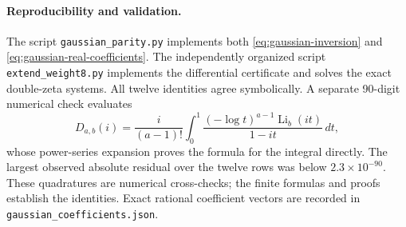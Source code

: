 \paragraph{Reproducibility and validation.}
The script \texttt{gaussian\_parity.py} implements both
\eqref{eq:gaussian-inversion} and \eqref{eq:gaussian-real-coefficients}.
The independently organized script \texttt{extend\_weight8.py} implements
the differential certificate and solves the exact double-zeta systems.
All twelve identities agree symbolically. A separate 90-digit numerical
check evaluates
\[
 D_{a,b}(i)=\frac{i}{(a-1)!}\int_0^1
       \frac{(-\log t)^{a-1}\operatorname{Li}_b(it)}{1-it}\,dt,
\]
whose power-series expansion proves the formula for the integral directly.
The largest observed absolute residual over the twelve rows was below
$2.3\times10^{-90}$. These quadratures are numerical cross-checks; the
finite formulas and proofs establish the identities. Exact rational
coefficient vectors are recorded in \texttt{gaussian\_coefficients.json}.

